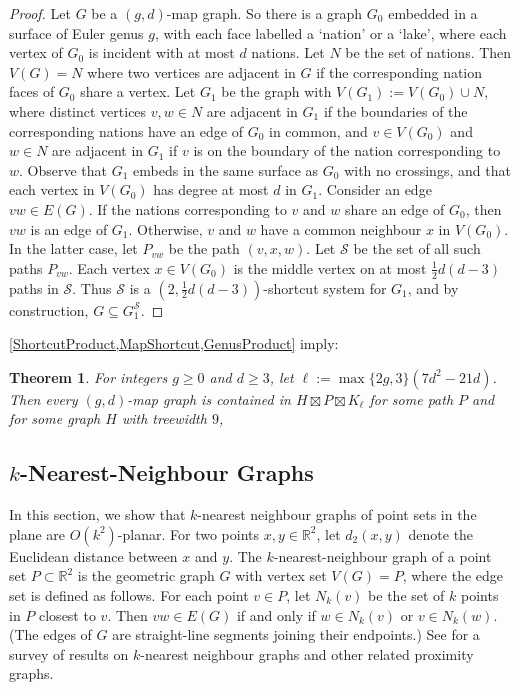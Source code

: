 \documentclass{patmorin}
\theoremstyle{plain}
\newtheorem{thm}{Theorem}
\theoremstyle{definition}
\renewcommand{\SS}{\mathcal{S}}
\renewcommand{\geq}{\geqslant}
\newcommand{\R}{\mathbb{R}}
\begin{document}
\begin{proof}
Let $G$ be a $(g,d)$-map graph. So there is a graph $G_0$ embedded in a surface of Euler genus $g$, with each face labelled a `nation' or a `lake', where each vertex of $G_0$ is incident with at most $d$ nations. Let $N$ be the set of nations. Then $V(G)=N$ where two vertices are adjacent in $G$ if the corresponding nation faces of $G_0$ share a vertex. Let $G_1$ be the graph with $V(G_1):=V(G_0) \cup N$, where distinct vertices $v,w\in N$ are adjacent in $G_1$ if the boundaries of the corresponding nations have an edge of $G_0$ in common, and $v\in V(G_0)$ and $w\in N$ are adjacent in $G_1$ if $v$ is on the boundary of the nation corresponding to $w$. Observe that $G_1$ embeds in the same surface as $G_0$ with no crossings, and that each vertex in $V(G_0)$ has degree at most $d$ in $G_1$. Consider an edge $vw\in E(G)$. If the nations corresponding to $v$ and $w$ share an edge of $G_0$, then $vw$ is an edge of $G_1$. Otherwise,  $v$ and $w$ have a common neighbour $x$ in $V(G_0)$. In the latter case, let $P_{vw}$ be the path $(v,x,w)$. Let $\SS$ be the set of all such paths $P_{vw}$. Each vertex $x\in V(G_0)$ is the middle vertex on at most $\tfrac12 d(d-3)$  paths in $\SS$. Thus $\SS$ is a $(2,\tfrac12 d(d-3))$-shortcut system for $G_1$, and by construction, $G \subseteq G_1^\SS$.
\end{proof}


\cref{ShortcutProduct,MapShortcut,GenusProduct} imply:

\begin{thm}
\label{gdMapProduct}
For integers $g\geq 0$ and $d\geq 3$, let $\ell:= \max\{2g,3\}(7d^2-21d)$.
Then every $(g,d)$-map graph is contained in $H\boxtimes P \boxtimes K_{\ell}$ for some path $P$ and for some graph $H$ with treewidth $9$,
\end{thm}


\subsection{$k$-Nearest-Neighbour Graphs}
\label{last_example}

In this section, we show that $k$-nearest neighbour graphs of point sets in the plane are $O(k^2)$-planar.  For two points $x,y\in\R^2$, let $d_2(x,y)$ denote the Euclidean distance between $x$ and $y$. The $k$-nearest-neighbour graph of a point set $P\subset\R^2$ is the geometric graph $G$ with vertex set $V(G)=P$, where the edge set is defined as follows. For each point $v\in P$, let $N_k(v)$ be the set of $k$ points in $P$ closest to $v$. Then $vw\in E(G)$ if and only if $w\in N_k(v)$ or $v\in N_k(w)$. (The edges of $G$ are straight-line segments joining their endpoints.) See \citep{ProximityGraphs} for a survey of results on $k$-nearest neighbour graphs and other related proximity graphs.
\end{document}
